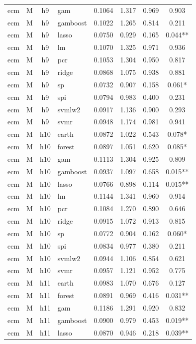 \begin{ThreePartTable}
\begin{longtable}[t]{llclcccc}
ecm & M & h9 & gam & 0.1064 & 1.317 & 0.969 & 0.903\\
ecm & M & h9 & gamboost & 0.1022 & 1.265 & 0.814 & 0.211\\
ecm & M & h9 & lasso & 0.0750 & 0.929 & 0.165 & 0.044**\\
ecm & M & h9 & lm & 0.1070 & 1.325 & 0.971 & 0.936\\
ecm & M & h9 & pcr & 0.1053 & 1.304 & 0.950 & 0.817\\
ecm & M & h9 & ridge & 0.0868 & 1.075 & 0.938 & 0.881\\
ecm & M & h9 & sp & 0.0732 & 0.907 & 0.158 & 0.061*\\
ecm & M & h9 & spi & 0.0794 & 0.983 & 0.400 & 0.231\\
ecm & M & h9 & svmlw2 & 0.0917 & 1.136 & 0.900 & 0.293\\
ecm & M & h9 & svmr & 0.0948 & 1.174 & 0.981 & 0.941\\
\addlinespace
ecm & M & h10 & earth & 0.0872 & 1.022 & 0.543 & 0.078*\\
ecm & M & h10 & forest & 0.0897 & 1.051 & 0.620 & 0.085*\\
ecm & M & h10 & gam & 0.1113 & 1.304 & 0.925 & 0.809\\
ecm & M & h10 & gamboost & 0.0937 & 1.097 & 0.658 & 0.015**\\
ecm & M & h10 & lasso & 0.0766 & 0.898 & 0.114 & 0.015**\\
ecm & M & h10 & lm & 0.1144 & 1.341 & 0.960 & 0.914\\
ecm & M & h10 & pcr & 0.1084 & 1.270 & 0.890 & 0.646\\
ecm & M & h10 & ridge & 0.0915 & 1.072 & 0.913 & 0.815\\
ecm & M & h10 & sp & 0.0772 & 0.904 & 0.162 & 0.060*\\
ecm & M & h10 & spi & 0.0834 & 0.977 & 0.380 & 0.211\\
ecm & M & h10 & svmlw2 & 0.0944 & 1.106 & 0.854 & 0.621\\
ecm & M & h10 & svmr & 0.0957 & 1.121 & 0.952 & 0.775\\
\addlinespace
ecm & M & h11 & earth & 0.0983 & 1.070 & 0.676 & 0.127\\
ecm & M & h11 & forest & 0.0891 & 0.969 & 0.416 & 0.031**\\
ecm & M & h11 & gam & 0.1186 & 1.291 & 0.920 & 0.832\\
ecm & M & h11 & gamboost & 0.0900 & 0.979 & 0.453 & 0.019**\\
ecm & M & h11 & lasso & 0.0870 & 0.946 & 0.218 & 0.039**\\

\end{longtable}
\end{ThreePartTable}

